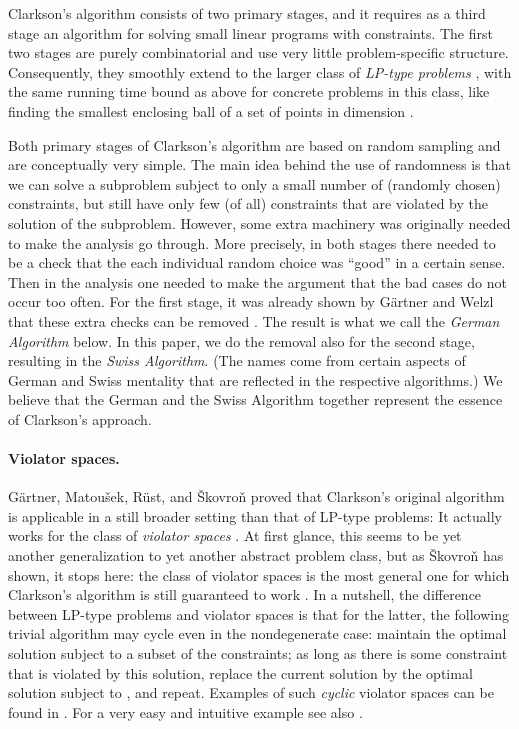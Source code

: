\documentclass[12pt]{article}
\theoremstyle{remark}
\begin{document}
Clarkson's algorithm consists of two primary stages, and it requires
as a third stage an algorithm for solving small linear programs with
 constraints. The first two stages are purely combinatorial and use
very little problem-specific structure.  Consequently, they smoothly
extend to the larger class of \emph{LP-type problems} \cite{MSW},
with the same running time bound as above for concrete problems in this
class, like finding the smallest enclosing ball of a set of  points
in dimension  \cite{GaerWel1}.

Both primary stages of Clarkson's algorithm are based on random sampling and
are conceptually very simple. The main idea behind the use of randomness
is that we can solve a subproblem subject to only a small number of
(randomly chosen) constraints, but still have only few (of all) constraints
that are violated by the solution of the subproblem.
 However, some extra machinery was
originally needed to make the analysis go through.  More precisely,
in both stages there needed to be a check that the each individual
random choice was ``good'' in a certain sense. Then in the analysis
one needed to make the argument that the bad cases do not
occur too often. For the first
stage, it was already shown by G\"artner and Welzl that these extra checks
 can be removed \cite{GWSampl01}. The result is what we call
the \emph{German Algorithm} below. In this paper, we do the removal
also for the second stage, resulting in the \emph{Swiss Algorithm}.
(The names come from certain aspects of German and Swiss mentality
that are reflected in the respective algorithms.) We believe that the
German and the Swiss Algorithm together represent the essence of
Clarkson's approach.

\paragraph{Violator spaces.}
G\"artner, Matou\v{s}ek, R\"ust, and \v{S}kovro\v{n} proved that
Clarkson's original algorithm is applicable in a still broader setting
than that of LP-type problems: It actually works for the class of
\emph{violator spaces} \cite{journals/dam/GartnerMRS08}. At first
glance, this seems to be yet another generalization to yet another
abstract problem class, but as \v{S}kovro\v{n} has shown, it stops
here: the class of violator spaces is the most general one for which
Clarkson's algorithm is still guaranteed to work \cite{skovronP}. In a
nutshell, the difference between LP-type problems and violator spaces
is that for the latter, the following trivial algorithm may cycle even
in the nondegenerate case: maintain the optimal solution subject to a
subset  of the constraints; as long as there is some constraint 
that is violated by this solution, replace the current solution by the
optimal solution subject to , and repeat. Examples of
such \emph{cyclic} violator spaces can be found in \cite{skovronP}.
For a very easy and intuitive example see also  \cite{journals/dam/GartnerMRS08}.
\end{document}
